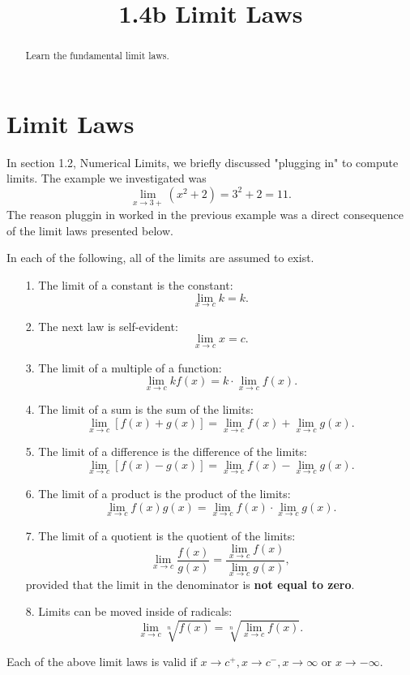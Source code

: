 \documentclass{ximera}
\title{1.4b Limit Laws}
\begin{document}
\begin{abstract}
Learn the fundamental limit laws.
\end{abstract}

\maketitle

\section{Limit Laws}
 
 In section 1.2, Numerical Limits, we briefly discussed "plugging in" to compute limits.
 The example we investigated was
 \[
 \lim_{x \to 3+} \left(x^2 + 2 \right) = 3^2 + 2 = 11.
 \]
 The reason pluggin in worked in the previous example was a direct consequence of the limit laws presented below.
 
In each of the following, all of the limits are assumed to exist.

\begin{enumerate}

\item[1.]  
The limit of a constant is the constant:
 \[
 \lim_{x \to c} k = k.
 \]
 
\item[2.]
 The next law is self-evident:
 \[
 \lim_{x \to c} x = c.
 \]
 
 \item[3.]
 The limit of a multiple of a function:
 \[
 \lim_{x \to c} kf(x) = k \cdot \lim_{x \to c} f(x). 
 \]
 
 \item[4.]
 The limit of a sum is the sum of the limits:
 \[
 \lim_{x \to c} \left[f(x) + g(x) \right] = \lim_{x \to c} f(x) + \lim_{x \to c} g(x). 
 \]
 
\item[5.]
 The limit of a difference is the difference of the limits:
 \[
 \lim_{x \to c} \left[f(x) - g(x) \right] = \lim_{x \to c} f(x) - \lim_{x \to c} g(x). 
 \]
 
\item[6.]
 The limit of a product is the product of the limits:
 \[
 \lim_{x \to c} f(x) g(x) = \lim_{x \to c} f(x) \cdot \lim_{x \to c} g(x). 
 \]


\item[7.]
 The limit of a quotient is the quotient of the limits:
 \[
 \lim_{x \to c} \frac{f(x)}{g(x)} = \frac{\lim_{x \to c} f(x)}{\lim_{x \to c} g(x)}, 
 \]
 provided that the limit in the denominator is \textbf{not equal to zero}.
 
 \item[8.]
 Limits can be moved inside of radicals:
 \[
 \lim_{x \to c} \sqrt[n]{f(x)} = \sqrt[n]{\lim_{x \to c} f(x)}. 
 \]

\end{enumerate}


Each of the above limit laws is valid if $x \to c^+, x\to c^-, x \to \infty$ or $x \to -\infty$.
\end{document}
